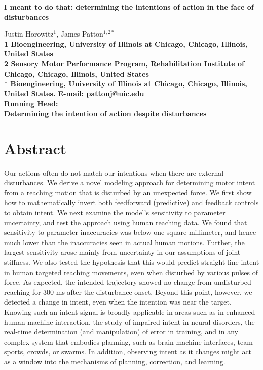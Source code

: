 \documentclass[10pt]{article}
\date{}
\begin{document}
\begin{titlepage}
\begin{center}
{\Large
\textbf{I meant to do that: determining the intentions of action in the face of disturbances}
}\\[1cm]
\end{center}

\begin{flushleft}
Justin Horowitz$^{1}$, 
James Patton$^{1,2\ast}$
\\
\bf{1} Bioengineering, University of Illinois at Chicago, Chicago, Illinois, United States
\\
\bf{2} Sensory Motor Performance Program, Rehabilitation Institute of Chicago, Chicago, Illinois, United States
\\
$\ast$ Bioengineering, University of Illinois at Chicago, Chicago, Illinois, United States. E-mail: pattonj@uic.edu
\\[1cm]
Running Head: \\
Determining the intention of action despite disturbances
\end{flushleft}
\end{titlepage}

\section*{Abstract}
Our actions often do not match our intentions when there are external disturbances. We derive a novel modeling approach for determining motor intent from a reaching motion that is disturbed by an unexpected force. We first show how to mathematically invert both feedforward (predictive) and feedback controls to obtain intent. We next examine the model’s sensitivity to parameter uncertainty, and test the approach using human reaching data. We found that sensitivity to parameter inaccuracies was below one square millimeter, and hence much lower than the inaccuracies seen in actual human motions. Further, the largest sensitivity arose mainly from uncertainty in our assumptions of joint stiffness. We also tested the hypothesis that this would predict straight-line intent in human targeted reaching movements, even when disturbed by various pulses of force. As expected, the intended trajectory showed no change from undisturbed reaching for 300 ms after the disturbance onset. Beyond this point, however, we detected a change in intent, even when the intention was near the target.  Knowing such an intent signal is broadly applicable in areas such as in enhanced human-machine interaction, the study of impaired intent in neural disorders, the real-time determination (and manipulation) of error in training, and in any complex system that embodies planning, such as brain machine interfaces, team sports, crowds, or swarms. In addition, observing intent as it changes might act as a window into the mechanisms of planning, correction, and learning.
\end{document}
